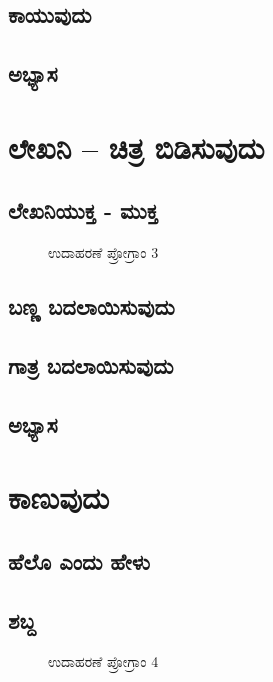 \documentclass[16pt]{book}
\begin{document}
\section{ಕಾಯುವುದು}

\section{ಅಭ್ಯಾಸ }

\chapter{ಲೇಖನಿ – ಚಿತ್ರ ಬಿಡಿಸುವುದು}

\section{ಲೇಖನಿಯುಕ್ತ - ಮುಕ್ತ}
\begin{figure}[h]
\begin{Scratch}[1]
\beginbox{}
\end{Scratch}
\caption{ಉದಾಹರಣೆ ಪ್ರೋಗ್ರಾಂ 3}
\end{figure}

\section{ಬಣ್ಣ ಬದಲಾಯಿಸುವುದು}

\section{ಗಾತ್ರ ಬದಲಾಯಿಸುವುದು}

\section{ಅಭ್ಯಾಸ }

\chapter{ಕಾಣುವುದು}

\section{ಹೆಲೊ ಎಂದು ಹೇಳು }

\section{ಶಬ್ದ }
\begin{figure}[h]
\begin{Scratch}[1]
\beginbox{}
\end{Scratch}
\caption{ಉದಾಹರಣೆ ಪ್ರೋಗ್ರಾಂ 4}
\end{figure}
\end{document}

